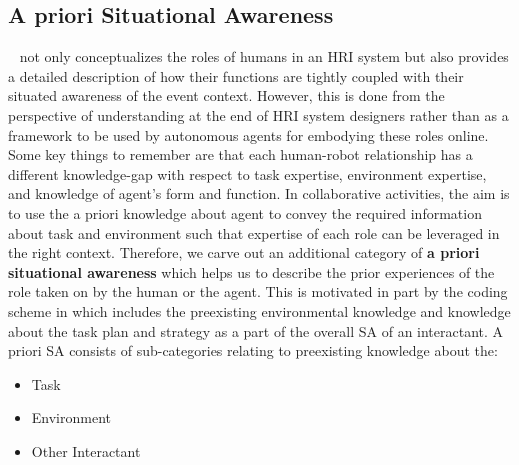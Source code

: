 \documentclass[letterpaper, 10 pt, conference]{ieeeconf}  %
\theoremstyle{definition}
\newcommand{\citet}[1]{\citeauthor{#1}~\cite{#1}}
\begin{document}
{\subsection{A priori Situational Awareness}
\label{subsec:stereotyping-roles}

\citet{Scholtz2003} not only conceptualizes the roles of humans in an HRI system but also provides a detailed description of how their functions are tightly coupled with their situated awareness of the event context.
However, this is done from the perspective of understanding at the end of HRI system designers rather than as a framework to be used by autonomous agents for embodying these roles online.
Some key things to remember are that each human-robot relationship has a different knowledge-gap with respect to task expertise, environment expertise, and knowledge of agent's form and function.
In collaborative activities, the aim is to use the a priori knowledge about agent to convey the required information about task and environment such that expertise of each role can be leveraged in the right context.
Therefore, we carve out an additional category of \textbf{a priori situational awareness} which helps us to describe the prior experiences of the role taken on by the human or the agent.
This is motivated in part by the coding scheme in \cite{Burke2004Miami} which includes the preexisting environmental knowledge and knowledge about the task plan and strategy as a part of the overall SA of an interactant.
A priori SA consists of sub-categories relating to preexisting knowledge about the:
\begin{itemize}
    \item Task
    \item Environment
    \item Other Interactant
\end{itemize}

}
\end{document}
